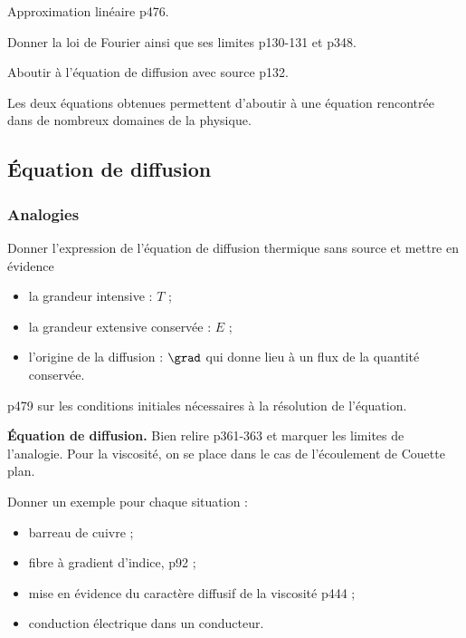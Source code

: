 Approximation linéaire \cite{Diu2008} p476.

Donner la loi de Fourier ainsi que ses limites \cite{Sanz2016} p130-131 et \cite{Olivier2000} p348.

Aboutir à l'équation de diffusion avec source \cite{Sanz2016} p132.

\begin{transition}
Les deux équations obtenues permettent d'aboutir à une équation rencontrée dans de nombreux domaines de la physique.
\end{transition}

\subsection{Équation de diffusion}

\subsubsection{Analogies}

Donner l'expression de l'équation de diffusion thermique sans source et mettre en évidence
\begin{itemize}
\item la grandeur intensive : $T$ ;
\item la grandeur extensive conservée : $E$ ;
\item l'origine de la diffusion : $\grad$ qui donne lieu à un flux de la quantité conservée.
\end{itemize}
\cite{Diu2008} p479 sur les conditions initiales nécessaires à la résolution de l'équation.

\begin{slide}
\textbf{Équation de diffusion.}
Bien relire \cite{Olivier2000} p361-363 et marquer les limites de l'analogie.
Pour la viscosité, on se place dans le cas de l'écoulement de Couette plan.

\noindent
Donner un exemple pour chaque situation :
\begin{itemize}
\item barreau de cuivre ;
\item fibre à gradient d'indice, \cite{Olivier1998} p92 ;
\item mise en évidence du caractère diffusif de la viscosité \cite{Olivier2000} p444 ;
\item conduction électrique dans un conducteur.
\end{itemize}
\end{slide}

